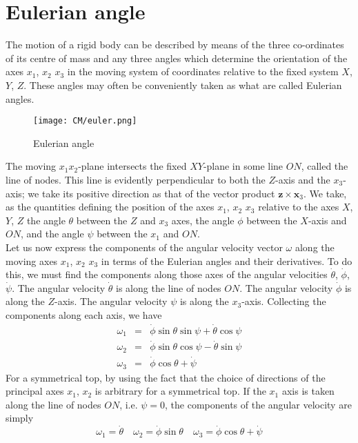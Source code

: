 \documentclass[cyan]{elegantnote}
\begin{document}
\section{Eulerian angle}
The motion of a rigid body can be described by means of the three co-ordinates of its centre of mass and any three angles which determine the orientation of the axes $x_1$, $x_2$ $x_3$ in the moving system of coordinates relative to the fixed system $X$, $Y$, $Z$. These angles may often be conveniently taken as what are called Eulerian angles.
\begin{figure}[!h]
	\centering
	\texttt{[image: CM/euler.png]}
	\caption{Eulerian angle}
\end{figure}
The moving $x_1x_2$-plane intersects the fixed $XY$-plane in some line $ON$, called the line of nodes. 
This line is evidently perpendicular to both the $Z$-axis and the $x_3$-axis; we take its positive direction as that of the vector product $\bm{z} \times \bm{x}_3$.
We take, as the quantities defining the position of the axes $x_1$, $x_2$ $x_3$ relative to the axes $X$, $Y$, $Z$ the angle $\theta$ between the $Z$ and $x_3$ axes, the angle $\phi$ between the $X$-axis and $ON$, and the angle $\psi$  between the $x_1$ and $ON$.\\
Let us now express the components of the angular velocity  vector $\omega$ along the moving axes $x_1$, $x_2$ $x_3$ in terms of the Eulerian angles and their derivatives. 
To do this, we must find the components along those axes of the angular velocities $\dot{\theta}$, $\dot{\phi}$, $\dot{\psi}$. The angular velocity $\dot{\theta}$ is along the line of nodes $ON$. The angular velocity $\dot{\phi}$ is along the $Z$-axis. The angular velocity $\psi$ is along the $x_3$-axis. Collecting the components along each axis, we have
\begin{eqnarray}
\omega_1 &=& \dot{\phi}\sin\theta\sin\psi + \dot{\theta}\cos\psi \nonumber \\
\omega_2 &=& \dot{\phi}\sin\theta\cos\psi - \dot{\theta}\sin\psi \nonumber \\
\omega_3 &=& \dot{\phi} \cos\theta + \dot{\psi} \nonumber
\end{eqnarray}
For a symmetrical top, by using the fact that the choice of directions of the principal axes $x_1$, $x_2$ is arbitrary for a symmetrical top. 
If the $x_1$ axis is taken along the line of nodes $ON$, i.e. $\psi = 0$, the components of the angular velocity are simply
\[\omega_1 = \dot{\theta} \quad \omega_2 = \dot{\phi}\sin\theta \quad \omega_3 = \dot{\phi}\cos\theta + \dot{\psi}\]
\end{document}
